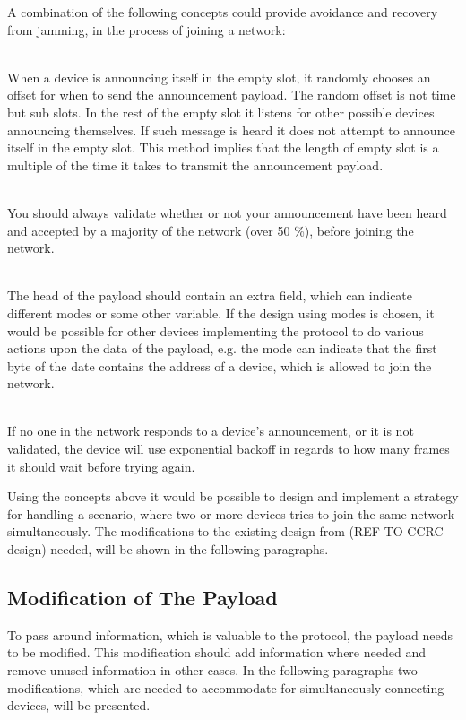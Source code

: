 A combination of the following concepts could provide avoidance and recovery from jamming, in the process of joining a network: 
\begin{description}[labelindent=\parindent]
    \item[Random Offset]\hfill\\
    When a device is announcing itself in the empty slot, it randomly chooses an offset for when to send the announcement payload.
    The random offset is not time but sub slots. 
    In the rest of the empty slot it listens for other possible devices announcing themselves.
    If such message is heard it does not attempt to announce itself in the empty slot.
    This method implies that the length of empty slot is a multiple of the time it takes to transmit the announcement payload.
    \item[Validation]\hfill\\
    You should always validate whether or not your announcement have been heard and accepted by a majority of the network (over 50 \%), before joining the network.
    \item[Payload Mode]\hfill\\
    The head of the payload should contain an extra field, which can indicate different modes or some other variable.
    If the design using modes is chosen, it would be possible for other devices implementing the protocol to do various actions upon the data of the payload, e.g. the mode can indicate that the first byte of the date contains the address of a device, which is allowed to join the network.
    \item[Exponential Backoff]\hfill\\ 
    If no one in the network responds to a device's announcement, or it is not validated, the device will use exponential backoff in regards to how many frames it should wait before trying again.
\end{description} 
\noindent
Using the concepts above it would be possible to design and implement a strategy for handling a scenario, where two or more devices tries to join the same network simultaneously.
The modifications to the existing design from (REF TO CCRC-design) needed, will be shown in the following paragraphs.

\subsection{Modification of The Payload} %
\label{sub:modification_of_the_payload}
To pass around information, which is valuable to the protocol, the payload needs to be modified.
This modification should add information where needed and remove unused information in other cases.
In the following paragraphs two modifications, which are needed to accommodate for simultaneously connecting devices, will be presented. 

